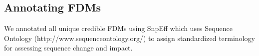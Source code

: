 \subsection{Annotating FDMs}
We annotated all unique credible FDMs using SnpEff \cite{cingolani2012program} which uses Sequence Ontology (http://www.sequenceontology.org/) to assign standardized terminology for assessing sequence change and impact. 




 

